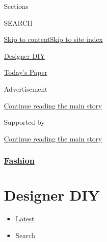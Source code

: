 Sections

SEARCH

\protect\hyperlink{site-content}{Skip to
content}\protect\hyperlink{site-index}{Skip to site index}

\href{https://www.nytimes.com/issue/fashion/2020/06/19/designer-diy}{Designer
DIY}

\href{https://myaccount.nytimes.com/auth/login?response_type=cookie\&client_id=vi}{}

\href{https://www.nytimes.com/section/todayspaper}{Today's Paper}

Advertisement

\protect\hyperlink{after-top}{Continue reading the main story}

Supported by

\protect\hyperlink{after-sponsor}{Continue reading the main story}

\hypertarget{fashion}{%
\subsubsection{\texorpdfstring{\href{/section/fashion}{Fashion}}{Fashion}}\label{fashion}}

\hypertarget{designer-diy}{%
\section{Designer DIY}\label{designer-diy}}

\begin{itemize}
\tightlist
\item
  \protect\hyperlink{stream-panel}{Latest}
\item
  Search
\end{itemize}

